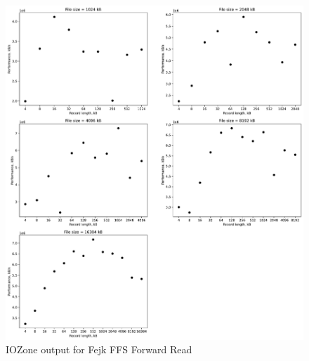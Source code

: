 \begin{figure}[!htb]
	\label{fig:app_bencfh_ffs_read}
	\begin{center}
		\includegraphics[width=1.0\textwidth]{figures/benchmarking/fake-ffs/Read.pdf}
	\end{center}
	\caption{IOZone output for Fejk \gls{FFS} Forward Read}
\end{figure}

